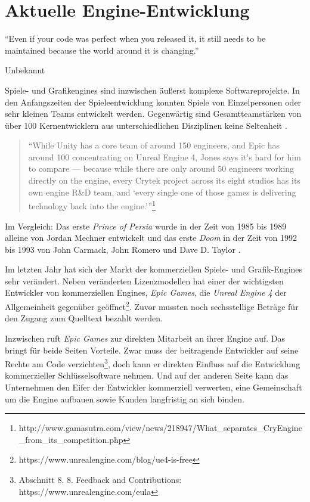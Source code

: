 \chapter{Aktuelle Engine-Entwicklung}
\label{chap:engine-uebersicht}

\epigraph{"`Even if your code was perfect when you released it, it still needs to be maintained because the world around it is changing."'}{Unbekannt}

Spiele- und Grafikengines sind inzwischen äußerst komplexe Softwareprojekte. In den Anfangszeiten der Spieleentwicklung konnten Spiele von Einzelpersonen oder sehr kleinen Teams entwickelt werden. Gegenwärtig sind Gesamtteamstärken von über 100 Kernentwicklern aus unterschiedlichen Disziplinen keine Seltenheit \parencite[Kapitel 8, Abschnitt: "`The Problem with Large Teams"']{keith2010agile}.

\begin{quote}
% 
"`While Unity has a core team of around 150 engineers, and Epic has around 100 concentrating on Unreal Engine 4, Jones says it's hard for him to compare --- because while there are only around 50 engineers working directly on the engine, every Crytek project across its eight studios has its own engine R\&D team, and `every single one of those games is delivering technology back into the engine.'"'\footnote{http://www.gamasutra.com/view/news/218947/What\_separates\_CryEngine\_from\_its\_competition.php}
\end{quote}

Im Vergleich: Das erste \textit{Prince of Persia} wurde in der Zeit von 1985 bis 1989 alleine von Jordan Mechner entwickelt \parencite{Mechner1993} und das erste \textit{Doom} in der Zeit von 1992 bis 1993 von John Carmack, John Romero und Dave D. Taylor \parencite{Kushner2003}.

Im letzten Jahr hat sich der Markt der kommerziellen Spiele- und Grafik-Engines sehr verändert. Neben veränderten Lizenzmodellen hat einer der wichtigsten Entwickler von kommerziellen Engines, \textit{Epic Games}, die \textit{Unreal Engine 4} der Allgemeinheit gegenüber geöffnet\footnote{https://www.unrealengine.com/blog/ue4-is-free}. Zuvor mussten noch sechsstellige Beträge für den Zugang zum Quelltext bezahlt werden. 

Inzwischen ruft \textit{Epic Games} zur direkten Mitarbeit an ihrer Engine auf. Das bringt für beide Seiten Vorteile. Zwar muss der beitragende Entwickler auf seine Rechte am Code verzichten\footnote{Abschnitt 8. 8. Feedback and Contributions: https://www.unrealengine.com/eula}, doch kann er direkten Einfluss auf die Entwicklung kommerzieller Schlüsselsoftware nehmen. Und auf der anderen Seite kann das Unternehmen den Eifer der Entwickler kommerziell verwerten, eine Gemeinschaft um die Engine aufbauen sowie Kunden langfristig an sich binden.

